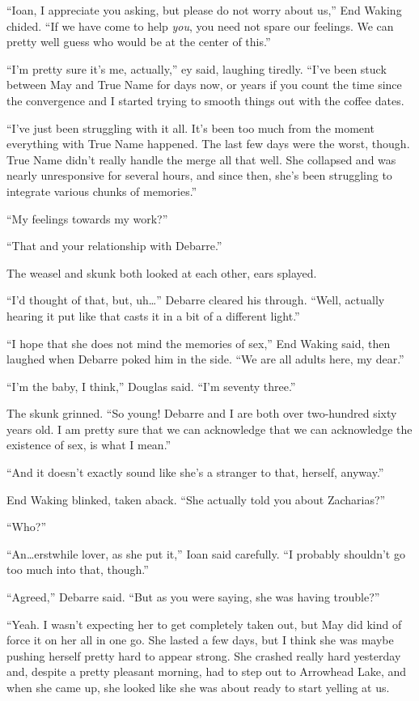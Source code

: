 ``Ioan, I appreciate you asking, but please do not worry about us,'' End Waking chided. ``If we have come to help \emph{you}, you need not spare our feelings. We can pretty well guess who would be at the center of this.''

``I'm pretty sure it's me, actually,'' ey said, laughing tiredly. ``I've been stuck between May and True Name for days now, or years if you count the time since the convergence and I started trying to smooth things out with the coffee dates.

``I've just been struggling with it all. It's been too much from the moment everything with True Name happened. The last few days were the worst, though. True Name didn't really handle the merge all that well. She collapsed and was nearly unresponsive for several hours, and since then, she's been struggling to integrate various chunks of memories.''

``My feelings towards my work?''

``That and your relationship with Debarre.''

The weasel and skunk both looked at each other, ears splayed.

``I'd thought of that, but, uh\ldots{}'' Debarre cleared his through. ``Well, actually hearing it put like that casts it in a bit of a different light.''

``I hope that she does not mind the memories of sex,'' End Waking said, then laughed when Debarre poked him in the side. ``We are all adults here, my dear.''

``I'm the baby, I think,'' Douglas said. ``I'm seventy three.''

The skunk grinned. ``So young! Debarre and I are both over two-hundred sixty years old. I am pretty sure that we can acknowledge that we can acknowledge the existence of sex, is what I mean.''

``And it doesn't exactly sound like she's a stranger to that, herself, anyway.''

End Waking blinked, taken aback. ``She actually told you about Zacharias?''

``Who?''

``An\ldots erstwhile lover, as she put it,'' Ioan said carefully. ``I probably shouldn't go too much into that, though.''

``Agreed,'' Debarre said. ``But as you were saying, she was having trouble?''

``Yeah. I wasn't expecting her to get completely taken out, but May did kind of force it on her all in one go. She lasted a few days, but I think she was maybe pushing herself pretty hard to appear strong. She crashed really hard yesterday and, despite a pretty pleasant morning, had to step out to Arrowhead Lake, and when she came up, she looked like she was about ready to start yelling at us.

